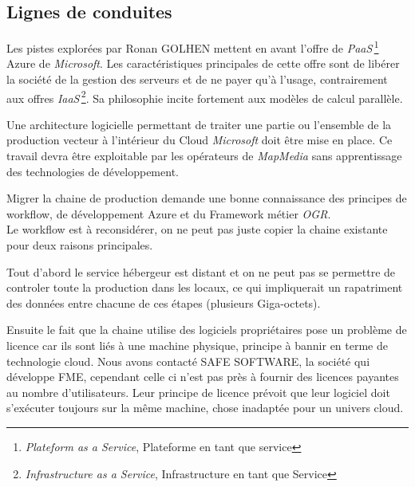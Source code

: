%
%

\subsection{Lignes de conduites}

Les pistes explorées par Ronan GOLHEN mettent en avant l'offre de
\textit{PaaS}\,\footnote{\textit{Plateform as a Service}, Plateforme
  en tant que service} Azure de \textit{Microsoft}. Les
caractéristiques principales de cette offre sont de libérer la société
de la gestion des serveurs et de ne payer qu'à l'usage, contrairement
aux offres \textit{IaaS}\,\footnote{\textit{Infrastructure as a
    Service}, Infrastructure en tant que Service}. Sa philosophie
incite fortement aux modèles de calcul parallèle.


Une architecture logicielle permettant de traiter une partie ou
l'ensemble de la production vecteur à l'intérieur du Cloud
\textit{Microsoft} doit être mise en place. Ce travail devra être
exploitable par les opérateurs de \textit{MapMedia} sans apprentissage
des technologies de développement.


Migrer la chaine de production demande une bonne connaissance des
principes de workflow, de développement Azure et du Framework métier
\textit{OGR}.\\

Le workflow est à reconsidérer, on ne peut pas juste copier la chaine
existante pour deux raisons principales.

Tout d'abord le service hébergeur est distant et on ne peut pas se
permettre de controler toute la production dans les locaux, ce qui
impliquerait un rapatriment des données entre chacune de ces étapes
(plusieurs Giga-octets). 

Ensuite le fait que la chaine utilise des logiciels propriétaires pose
un problème de licence car ils sont liés à une machine physique,
principe à bannir en terme de technologie cloud.  Nous avons contacté
SAFE SOFTWARE, la société qui développe FME, cependant celle ci n'est
pas près à fournir des licences payantes au nombre
d'utilisateurs. Leur principe de licence prévoit que leur logiciel
doit s'exécuter toujours sur la même machine, chose inadaptée pour un
univers cloud.\\


